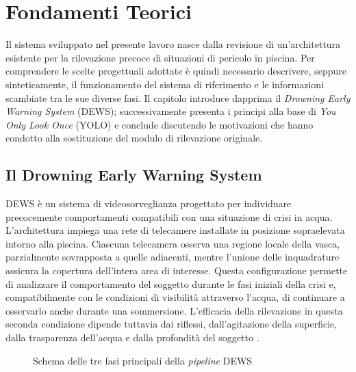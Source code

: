\chapter{Fondamenti Teorici}

Il sistema sviluppato nel presente lavoro nasce dalla revisione di un'architettura esistente per la rilevazione precoce di situazioni di pericolo in piscina. Per comprendere le scelte progettuali adottate è quindi necessario descrivere, seppure sinteticamente, il funzionamento del sistema di riferimento e le informazioni scambiate tra le sue diverse fasi. Il capitolo introduce dapprima il \textit{Drowning Early Warning System} (DEWS); successivamente presenta i principi alla base di \textit{You Only Look Once} (YOLO) e conclude discutendo le motivazioni che hanno condotto alla sostituzione del modulo di rilevazione originale.

\section{Il Drowning Early Warning System}

DEWS è un sistema di videosorveglianza progettato per individuare precocemente comportamenti compatibili con una situazione di crisi in acqua. L'architettura impiega una rete di telecamere installate in posizione sopraelevata intorno alla piscina. Ciascuna telecamera osserva una regione locale della vasca, parzialmente sovrapposta a quelle adiacenti, mentre l'unione delle inquadrature assicura la copertura dell'intera area di interesse. Questa configurazione permette di analizzare il comportamento del soggetto durante le fasi iniziali della crisi e, compatibilmente con le condizioni di visibilità attraverso l'acqua, di continuare a osservarlo anche durante una sommersione. L'efficacia della rilevazione in questa seconda condizione dipende tuttavia dai riflessi, dall'agitazione della superficie, dalla trasparenza dell'acqua e dalla profondità del soggetto \cite{Eng2008DEWS}.

\begin{figure}[htbp]
    \centering
    \caption[Fasi principali della \textit{pipeline} DEWS]{Schema delle tre fasi principali della \textit{pipeline} DEWS}
    \label{fig:pipeline-dews}
\end{figure}

